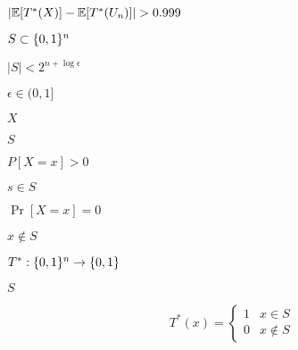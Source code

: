 \documentclass[10pt]{book}
\begin{document}
\begin{mdSnippets}
\begin{mdInlineSnippet}
$| \E[ T^*(X)] - \E[T^*(U_n)] |>0.999$\end{mdInlineSnippet}%
\begin{mdInlineSnippet}[a5021131ab5a2e87f132dfdfa6f55df3]%
$S \subset \{0,1\}^n$\end{mdInlineSnippet}%
\begin{mdInlineSnippet}%
$|S| < 2^{n + \log \epsilon}$\end{mdInlineSnippet}%
\begin{mdInlineSnippet}%
$\epsilon \in (0,1]$\end{mdInlineSnippet}%
\begin{mdInlineSnippet}[02129bb861061d1a052c592e2dc6b383]%
$X$\end{mdInlineSnippet}%
\begin{mdInlineSnippet}%
$S$\end{mdInlineSnippet}%
\begin{mdInlineSnippet}[3639089ef4747706da64ca5e94503442]%
$P[X = x] > 0$\end{mdInlineSnippet}%
\begin{mdInlineSnippet}[0718ed5a3e27d89dc5efb8160425a476]%
$s \in S$\end{mdInlineSnippet}%
\begin{mdInlineSnippet}[a00037094b9aa715e2ff4b3a101fcb16]%
$\Pr[X = x] = 0$\end{mdInlineSnippet}%
\begin{mdInlineSnippet}%
$x \notin S$\end{mdInlineSnippet}%
\begin{mdInlineSnippet}[8cd99eac512a1b74080096658722295a]%
$T^*: \{0,1\}^n \to \{0,1\}$\end{mdInlineSnippet}%
\begin{mdInlineSnippet}%
$S$\end{mdInlineSnippet}%
\begin{mdDisplaySnippet}[1f80a343589323ae3f0dc99a14bc0962]%
\[%
T^*(x) = \begin{cases} 
 1 & x \in S \\
 0 & x \notin S 

\end{cases}\]
\end{mdDisplaySnippet}
\end{mdSnippets}
\end{document}

